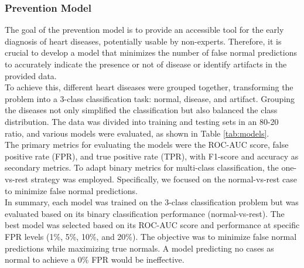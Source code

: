 \subsubsection*{Prevention Model}
The goal of the prevention model is to provide an accessible tool for the early diagnosis of heart 
diseases, potentially usable by non-experts. Therefore, it is crucial to develop a model that 
minimizes the number of false normal predictions to accurately indicate the presence or not
of disease or identify artifacts in the provided data.\\
To achieve this, different heart diseases were grouped together, transforming the problem 
into a 3-class classification task: normal, disease, and artifact. Grouping the diseases not 
only simplified the classification but also balanced the class distribution. The data was 
divided into training and testing sets in an 80-20 ratio, and various models were evaluated, 
as shown in Table \ref{tab:models}.\\
The primary metrics for evaluating the models were the ROC-AUC score, false positive rate (FPR), 
and true positive rate (TPR), with F1-score and accuracy as secondary metrics. 
To adapt binary metrics for multi-class classification, the one-vs-rest strategy was employed. 
Specifically, we focused on the normal-vs-rest case to minimize false normal predictions.\\
In summary, each model was trained on the 3-class classification problem but was evaluated based on 
its binary classification performance (normal-vs-rest). The best model was selected based on its 
ROC-AUC score and performance at specific FPR levels (1\%, 5\%, 10\%, and 20\%). The objective was 
to minimize false normal predictions while maximizing true normals. A model predicting no cases 
as normal to achieve a 0\% FPR would be ineffective.